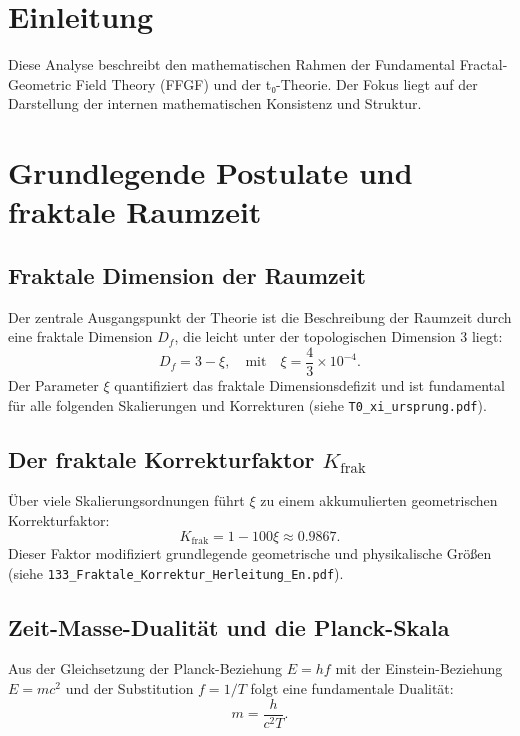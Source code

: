 \section{Einleitung}
	Diese Analyse beschreibt den mathematischen Rahmen der Fundamental Fractal-Geometric Field Theory (FFGF) und der t₀-Theorie. Der Fokus liegt auf der Darstellung der internen mathematischen Konsistenz und Struktur.
	
	\section{Grundlegende Postulate und fraktale Raumzeit}
	\subsection{Fraktale Dimension der Raumzeit}
	Der zentrale Ausgangspunkt der Theorie ist die Beschreibung der Raumzeit durch eine fraktale Dimension \(D_f\), die leicht unter der topologischen Dimension 3 liegt:
	\begin{equation}
		D_f = 3 - \xi, \quad \text{mit} \quad \xi = \frac{4}{3} \times 10^{-4}.
		\label{eq:fractal_dimension}
	\end{equation}
	Der Parameter \(\xi\) quantifiziert das fraktale Dimensionsdefizit und ist fundamental für alle folgenden Skalierungen und Korrekturen 
	(siehe \texttt{T0\_xi\_ursprung.pdf}).
	
	\subsection{Der fraktale Korrekturfaktor \(K_{\text{frak}}\)}
	Über viele Skalierungsordnungen führt \(\xi\) zu einem akkumulierten geometrischen Korrekturfaktor:
	\begin{equation}
		K_{\text{frak}} = 1 - 100\xi \approx 0.9867.
		\label{eq:K_frak}
	\end{equation}
	Dieser Faktor modifiziert grundlegende geometrische und physikalische Größen 
	(siehe \texttt{133\_Fraktale\_Korrektur\_Herleitung\_En.pdf}).
	
	\subsection{Zeit-Masse-Dualität und die Planck-Skala}
	Aus der Gleichsetzung der Planck-Beziehung \(E = hf\) mit der Einstein-Beziehung \(E = mc^2\) und der Substitution \(f = 1/T\) folgt eine fundamentale Dualität:
	\begin{equation}
		m = \frac{h}{c^2 T}.
		\label{eq:time_mass_duality}
	\end{equation}
